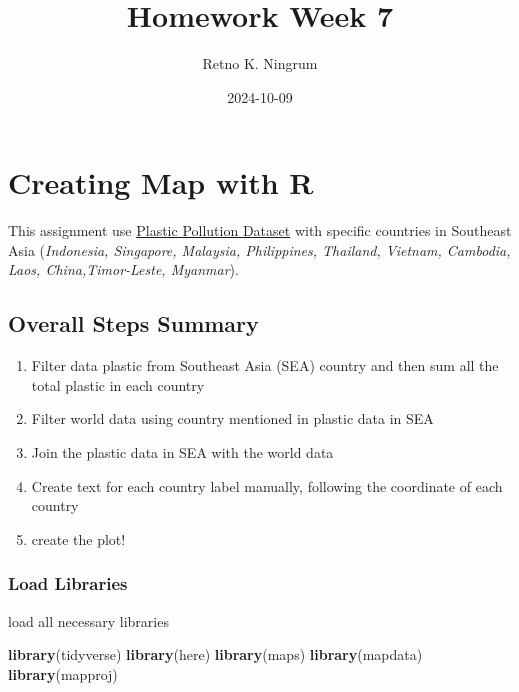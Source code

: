 \documentclass[
]{article}
\title{Homework Week 7}
\author{Retno K. Ningrum}
\date{2024-10-09}
\newenvironment{Shaded}{\begin{snugshade}}{\end{snugshade}}
\newcommand{\FunctionTok}[1]{\textcolor[rgb]{0.13,0.29,0.53}{\textbf{#1}}}
\newcommand{\NormalTok}[1]{#1}
\providecommand{\tightlist}{%
  \setlength{\itemsep}{0pt}\setlength{\parskip}{0pt}}
\begin{document}
\maketitle

\hypertarget{creating-map-with-r}{%
\section{Creating Map with R}\label{creating-map-with-r}}

This assignment use
\href{https://raw.githubusercontent.com/rfordatascience/tidytuesday/master/data/2021/2021-01-26/plastics.csv}{Plastic
Pollution Dataset} with specific countries in Southeast Asia
(\emph{Indonesia, Singapore, Malaysia, Philippines, Thailand, Vietnam,
Cambodia, Laos, China,Timor-Leste, Myanmar}).

\hypertarget{overall-steps-summary}{%
\subsection{Overall Steps Summary}\label{overall-steps-summary}}

\begin{enumerate}
\def\labelenumi{\arabic{enumi}.}
\tightlist
\item
  Filter data plastic from Southeast Asia (SEA) country and then sum all
  the total plastic in each country
\item
  Filter world data using country mentioned in plastic data in SEA
\item
  Join the plastic data in SEA with the world data
\item
  Create text for each country label manually, following the coordinate
  of each country
\item
  create the plot!
\end{enumerate}

\hypertarget{load-libraries}{%
\subsubsection{Load Libraries}\label{load-libraries}}

load all necessary libraries

\begin{Shaded}
\begin{Highlighting}[]
\FunctionTok{library}\NormalTok{(tidyverse)}
\FunctionTok{library}\NormalTok{(here)}
\FunctionTok{library}\NormalTok{(maps)}
\FunctionTok{library}\NormalTok{(mapdata)}
\FunctionTok{library}\NormalTok{(mapproj)}
\end{Highlighting}
\end{Shaded}
\end{document}
